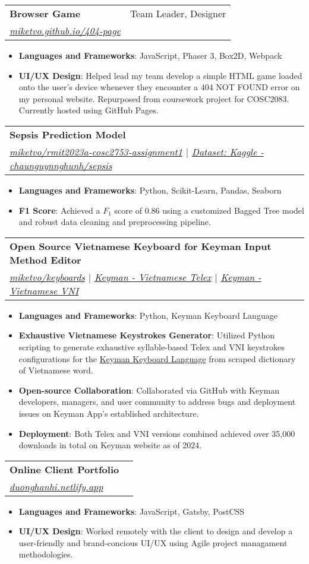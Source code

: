 \documentclass[a4paper,11pt]{article}
\makeatletter
\newcommand{\resumeItem}[2]{
  \item\small{
    \textbf{#1}{: #2 \vspace{-2pt}}
  }
}
\newcommand{\resumeSubheading}[4]{
  \vspace{-1pt}\item
    \begin{tabular*}{0.97\textwidth}{l@{\extracolsep{\fill}}r}
      \textbf{#1} & #2 \\
      \textit{\small#3} & \textit{\small #4} \\
    \end{tabular*}\vspace{-5pt}
}
\newcommand{\resumeItemListStart}{\begin{itemize}}
\newcommand{\resumeItemListEnd}{\end{itemize}\vspace{-5pt}}
\makeatother
\begin{document}
    \resumeSubheading
      {Browser Game}{Team Leader, Designer}
      {\href{https://miketvo.github.io/404-page.html}{\faGlobe\space miketvo.github.io/404-page}}{}
      \resumeItemListStart
        \resumeItem{Languages and Frameworks}
          {JavaScript, Phaser 3, Box2D, Webpack}
        \resumeItem{UI/UX Design}
          {Helped lead my team develop a simple HTML game loaded onto the user's device whenever they encounter a 404 NOT FOUND error on my personal website. Repurposed from coursework project for COSC2083. Currently hosted using GitHub Pages.}
      \resumeItemListEnd

    \resumeSubheading
      {Sepsis Prediction Model}{}
      {\href{https://github.com/miketvo/rmit2023a-cosc2753-assignment1}{\faGithub\space miketvo/rmit2023a-cosc2753-assignment1} $|$ \href{https://www.kaggle.com/datasets/chaunguynnghunh/sepsis/}{\faDatabase\space Dataset: Kaggle - chaunguynnghunh/sepsis}}{}
      \resumeItemListStart
        \resumeItem{Languages and Frameworks}
          {Python, Scikit-Learn, Pandas, Seaborn}
        \resumeItem{F1 Score}
          {Achieved a $F_1$ score of 0.86 using a customized Bagged Tree model and robust data cleaning and preprocessing pipeline.}
      \resumeItemListEnd

    \resumeSubheading
      {Open Source Vietnamese Keyboard for Keyman Input Method Editor}{}
      {\href{https://github.com/miketvo/keyboards}{\faGithub\space miketvo/keyboards} $|$ \href{https://keyman.com/keyboards/vietnamese_telex}{\faGlobe\space Keyman - Vietnamese Telex} $|$ \href{https://keyman.com/keyboards/vietnamese_vni}{\faGlobe\space Keyman - Vietnamese VNI}}{}
      \resumeItemListStart
        \resumeItem{Languages and Frameworks}
          {Python, Keyman Keyboard Language}
        \resumeItem{Exhaustive Vietnamese Keystrokes Generator}
          {Utilized Python scripting to generate exhaustive syllable-based Telex and VNI keystrokes configurations for the \href{https://help.keyman.com/developer/language/}{Keyman Keyboard Language} from scraped dictionary of Vietnamese word.}
        \resumeItem{Open-source Collaboration}
          {Collaborated via GitHub with Keyman developers, managers, and user community to address bugs and deployment issues on Keyman App's established architecture.}
        \resumeItem{Deployment}
          {Both Telex and VNI versions combined achieved over 35,000 downloads in total on Keyman website as of 2024.}
      \resumeItemListEnd

    \resumeSubheading
      {Online Client Portfolio}{}
      {\href{https://duonghanhi.netlify.app/}{\faGlobe\space duonghanhi.netlify.app}}{}
      \resumeItemListStart
        \resumeItem{Languages and Frameworks}
          {JavaScript, Gatsby, PostCSS}
        \resumeItem{UI/UX Design}
          {Worked remotely with the client to design and develop a user-friendly and brand-concious UI/UX using Agile project managament methodologies.}
      \resumeItemListEnd
\end{document}
